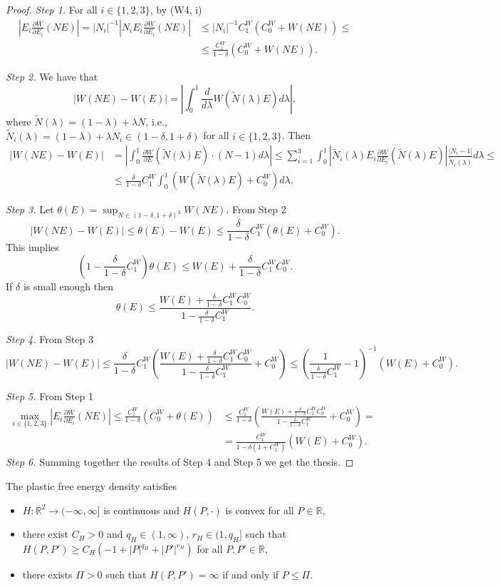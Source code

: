 \documentclass[a4paper,10pt,oneside]{amsbook}
\numberwithin{section}{chapter}
\numberwithin{equation}{chapter}
\theoremstyle{definition}
\newcommand{\dind}[2]{\frac{\partial #1}{\partial #2}}
\begin{document}
\begin{proof}
\emph{Step 1.} For all $i\in\{1,2,3\}$, by (W4, i)
\[
\begin{split}
\left|E_i\dind{W}{E_i}(NE)\right|=|N_i|^{-1}\left|N_iE_i\dind{W}{E_i}(NE)\right|&\le|N_i|^{-1}C_1^W(C_0^W+W(NE))\le\\
&\le\frac{C_1^W}{1-\delta}(C_0^W+W(NE)).
\end{split}
\]

\emph{Step 2.} We have that
\[
|W(NE)-W(E)|=\left|\int_0^1\frac{d}{d\lambda}W(\tilde N(\lambda)E)d\lambda\right|,
\]
where $\tilde N(\lambda)=(1-\lambda)+\lambda N$, i.e., $\tilde N_i(\lambda)=(1-\lambda)+\lambda N_i\in(1-\delta,1+\delta)$ for all $i\in\{1,2,3\}$. Then
\[
\begin{split}
|W(NE)-W(E)|&=\left|\int_0^1\dind{W}{E}(\tilde N(\lambda)E)\cdot(N-1)d\lambda\right|\le\sum_{i=1}^3\int_0^1\left|\tilde N_i(\lambda)E_i\dind{W}{E_i}(\tilde N(\lambda)E)\right|\frac{|N_i-1|}{\tilde N_i(\lambda)}d\lambda\le\\
&\le\frac{\delta}{1-\delta}C_1^W\int_0^1(W(\tilde N(\lambda)E)+C_0^W)d\lambda.
\end{split}
\]

\emph{Step 3.} Let $\theta(E)=\sup_{N\in(1-\delta,1+\delta)^3}W(NE)$. From Step 2
\[
|W(NE)-W(E)|\le\theta(E)-W(E)\le\frac{\delta}{1-\delta}C_1^W(\theta(E)+C_0^W).
\]
This implies
\[
\left(1-\frac{\delta}{1-\delta}C_1^W\right)\theta(E)\le W(E)+\frac{\delta}{1-\delta}C_1^WC_0^W.
\]
If $\delta$ is small enough then
\[
\theta(E)\le\frac{W(E)+\frac{\delta}{1-\delta}C_1^WC_0^W}{1-\frac{\delta}{1-\delta}C_1^W}.
\]

\emph{Step 4.} From Step 3
\[
|W(NE)-W(E)|\le\frac{\delta}{1-\delta}C_1^W\left(\frac{W(E)+\frac{\delta}{1-\delta}C_1^WC_0^W}{1-\frac{\delta}{1-\delta}C_1^W}+C_0^W\right)\le\left(\frac{1}{\frac{\delta}{1-\delta}C_1^W}-1\right)^{-1}(W(E)+C_0^W).
\]

\emph{Step 5.} From Step 1
\[
\begin{split}
\max_{i\in\{1,2,3\}}\left|E_i\dind{W}{E_i}(NE)\right|\le\frac{C_1^W}{1-\delta}(C_0^W+\theta(E))&\le\frac{C_1^W}{1-\delta}\left(\frac{W(E)+\frac{\delta}{1-\delta}C_1^WC_0^W}{1-\frac{\delta}{1-\delta}C_1^W}+C_0^W\right)=\\
&=\frac{C_1^W}{1-\delta(1+C_1^W)}(W(E)+C_0^W).
\end{split}
\]
\emph{Step 6.} Summing together the results of Step 4 and Step 5 we get the thesis.
\end{proof}
The plastic free energy density satisfies
\begin{itemize}[itemsep=1em]
\item[(H1)] $H\colon\mathbb{R}^2\to(-\infty,\infty]$ is continuous and $H(P,\cdot)$ is convex for all $P\in\mathbb{R}$,
\item[(H2)] there exist $C_H>0$ and $q_H\in(1,\infty)$, $r_H\in(1,q_H]$ such that $H(P,P')\ge C_H(-1+|P|^{q_H}+|P'|^{r_H})$ for all $P,P'\in\mathbb{R}$,
\item[(H3)] there exists $\Pi>0$ such that $H(P,P')=\infty$ if and only if $P\le\Pi$.
\end{itemize}
\end{document}
